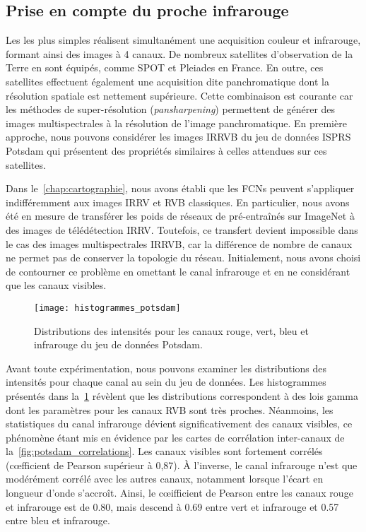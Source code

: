 \subsection{Prise en compte du proche infrarouge}

Les  les plus simples réalisent simultanément une acquisition couleur et infrarouge, formant ainsi des images à 4 canaux.
De nombreux satellites d'observation de la Terre en sont équipés, comme \gls{SPOT} et \gls{Pleiades} en France. En outre, ces satellites effectuent également une acquisition dite panchromatique dont la résolution spatiale est nettement supérieure. Cette combinaison est courante car les méthodes de super-résolution (\emph{pansharpening}) permettent de générer des images multispectrales à la résolution de l'image panchromatique. En première approche, nous pouvons considérer les images \gls{IRRVB} du jeu de données \gls{ISPRS} Potsdam qui présentent des propriétés similaires à celles attendues sur ces satellites.

Dans le~\cref{chap:cartographie}, nous avons établi que les \glspl{FCN} peuvent s'appliquer indifféremment aux images \gls{IRRV} et \gls{RVB} classiques. En particulier, nous avons été en mesure de transférer les poids de réseaux de pré-entraînés sur ImageNet à des images de télédétection \gls{IRRV}. Toutefois, ce transfert devient impossible dans le cas des images multispectrales \gls{IRRVB}, car la différence de nombre de canaux ne permet pas de conserver la topologie du réseau. Initialement, nous avons choisi de contourner ce problème en omettant le canal infrarouge et en ne considérant que les canaux visibles.

\begin{figure}[h]
  \texttt{[image: histogrammes\_potsdam]}
  \caption{Distributions des intensités pour les canaux rouge, vert, bleu et infrarouge du jeu de données  Potsdam.}
  \label{fig:potsdam_histograms}
\end{figure}

Avant toute expérimentation, nous pouvons examiner les distributions des intensités pour chaque canal au sein du jeu de données. Les histogrammes présentés dans la~\cref{fig:potsdam_histograms} révèlent que les distributions correspondent à des lois gamma dont les paramètres pour les canaux \gls{RVB} sont très proches. Néanmoins, les statistiques du canal infrarouge dévient significativement des canaux visibles, ce phénomène étant mis en évidence par les cartes de corrélation inter-canaux de la~\cref{fig:potsdam_correlations}. Les canaux visibles sont fortement corrélés (c\oe{}fficient de Pearson supérieur à 0,87). À l'inverse, le canal infrarouge n'est que modérément corrélé avec les autres canaux, notamment lorsque l'écart en longueur d'onde s'accroît. Ainsi, le c\oe{}ifficient de Pearson entre les canaux rouge et infrarouge est de \num{0,80}, mais descend à \num{0,69} entre vert et infrarouge et \num{0,57} entre bleu et infrarouge.

